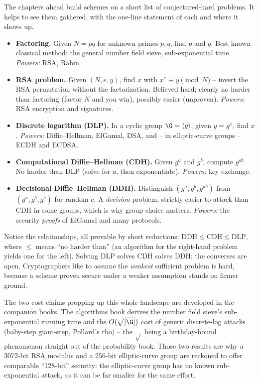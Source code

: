 The chapters ahead build schemes on a short list of conjectured-hard problems. It helps to see them gathered, with the one-line statement of each and where it shows up.

\begin{definition}
\label{ch08:def-assumptions}
\leavevmode
\begin{itemize}
\item \textbf{Factoring.} Given $N=pq$ for unknown primes $p,q$, find $p$ and $q$. Best known classical method: the general number field sieve, sub-exponential time. \emph{Powers:} RSA, Rabin.
\item \textbf{RSA problem.} Given $(N,e,y)$, find $x$ with $x^{e}\equiv y \pmod N$ -- invert the RSA permutation without the factorization. Believed hard; clearly no harder than factoring (factor $N$ and you win), possibly easier (unproven). \emph{Powers:} RSA encryption and signatures.
\item \textbf{Discrete logarithm (DLP).} In a cyclic group $\G=\langle g\rangle$, given $y=g^{x}$, find $x$. \emph{Powers:} Diffie--Hellman, ElGamal, DSA, and -- in elliptic-curve groups -- ECDH and ECDSA.
\item \textbf{Computational Diffie--Hellman (CDH).} Given $g^{a}$ and $g^{b}$, compute $g^{ab}$. No harder than DLP (solve for $a$, then exponentiate). \emph{Powers:} key exchange.
\item \textbf{Decisional Diffie--Hellman (DDH).} Distinguish $(g^a,g^b,g^{ab})$ from $(g^a,g^b,g^c)$ for random $c$. A \emph{decision} problem, strictly easier to attack than CDH in some groups, which is why group choice matters. \emph{Powers:} the security \emph{proofs} of ElGamal and many protocols.
\end{itemize}
\end{definition}

Notice the relationships, all provable by short reductions: $\text{DDH} \le \text{CDH} \le \text{DLP}$, where $\le$ means ``no harder than'' (an algorithm for the right-hand problem yields one for the left). Solving DLP solves CDH solves DDH; the converses are open. Cryptographers like to assume the \emph{weakest} sufficient problem is hard, because a scheme proven secure under a weaker assumption stands on firmer ground.

\begin{connectionbox}
The two cost claims propping up this whole landscape are developed in the companion books. The algorithms book derives the number field sieve's sub-exponential running time and the $O(\sqrt{|\G|})$ cost of generic discrete-log attacks (baby-step giant-step, Pollard's rho) -- the $\sqrt{}$ being a birthday-bound phenomenon straight out of the probability book. Those two results are why a 3072-bit RSA modulus and a 256-bit elliptic-curve group are reckoned to offer comparable ``128-bit'' security: the elliptic-curve group has no known sub-exponential attack, so it can be far smaller for the same effort.
\end{connectionbox}


